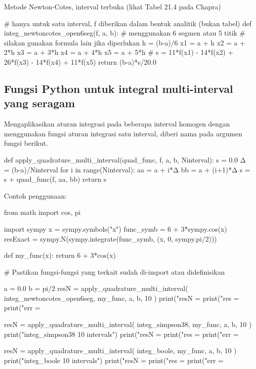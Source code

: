 Metode Newton-Cotes, interval terbuka (lihat Tabel 21.4 pada Chapra)
\begin{pythoncode}
# hanya untuk satu interval, f diberikan dalam bentuk analitik (bukan tabel)
def integ_newtoncotes_open6seg(f, a, b):
    # menggunakan 6 segmen atau 5 titik
    # silakan gunakan formula lain jika diperlukan
    h = (b-a)/6
    x1 = a + h
    x2 = a + 2*h
    x3 = a + 3*h
    x4 = a + 4*h
    x5 = a + 5*h
    #
    s = 11*f(x1) - 14*f(x2) + 26*f(x3) - 14*f(x4) + 11*f(x5)
    return (b-a)*s/20.0
\end{pythoncode}


\subsection*{Fungsi Python untuk integral multi-interval yang seragam}

Mengaplikasikan aturan integrasi pada beberapa interval homogen
dengan menggunakan fungsi aturan integrasi satu interval, diberi nama
 pada argumen fungsi berikut.
\begin{pythoncode}
def apply_quadrature_multi_interval(quad_func, f, a, b, Ninterval):
    s = 0.0
    Δ = (b-a)/Ninterval
    for i in range(Ninterval):
        aa = a + i*Δ
        bb = a + (i+1)*Δ
        s = s + quad_func(f, aa, bb)
    return s
\end{pythoncode}

Contoh penggunaan:
\begin{pythoncode}
from math import cos, pi

import sympy
x = sympy.symbols("x")
func_symb = 6 + 3*sympy.cos(x)
resExact = sympy.N(sympy.integrate(func_symb, (x, 0, sympy.pi/2)))

def my_func(x):
    return 6 + 3*cos(x)

# Pastikan fungsi-fungsi yang terkait sudah di-import atau didefinisikan

a = 0.0
b = pi/2
resN = apply_quadrature_multi_interval(
    integ_newtoncotes_open6seg, my_func, a, b, 10
)
print("resN = %
print("res  = %
print("err  = %

resN = apply_quadrature_multi_interval(
    integ_simpson38, my_func, a, b, 10
)
print("\nUsing integ_simpson38 10 intervals")
print("resN = %
print("res  = %
print("err  = %

resN = apply_quadrature_multi_interval(
    integ_boole, my_func, a, b, 10
)
print("\nUsing integ_boole 10 intervals")
print("resN = %
print("res  = %
print("err  = %
\end{pythoncode}

